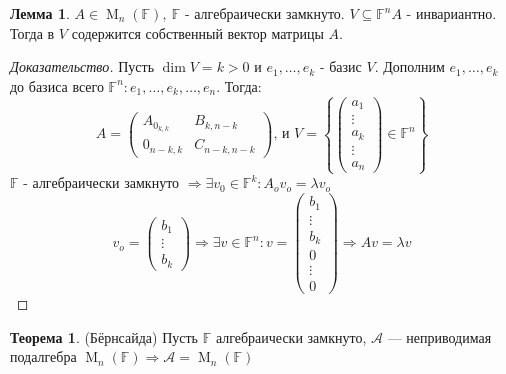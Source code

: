 \documentclass[a4paper, 14pt]{extarticle}
\theoremstyle{definition}
\newtheorem{theorem}{Теорема}
\newtheorem{lemma}{Лемма}
\begin{document}
\begin{lemma} \label{lm2_3}
	\(A \in \operatorname{M}_n(\mathbb{F}),\ \mathbb{F}\) - алгебраически замкнуто. \(V \subseteq \mathbb{F}^n A\) - инвариантно. Тогда в \(V\) содержится собственный вектор матрицы \(A\).
\end{lemma}

\begin{proof}[Доказательство]
	Пусть \(\operatorname{dim}V = k > 0\) и \(e_1, \dots, e_k\) - базис \(V\). Дополним \(e_1, \dots, e_k\) до базиса всего \(\mathbb{F}^n : e_1, \dots, e_k, \dots, e_n\). Тогда:
	\[A = 
		\left(
			\begin{array}{c|c}
			A_{0_{k, k}} & B_{k, n - k}\\
			\hline
			0_{n - k, k} & C_{n - k, n - k}
			\end{array}
		\right) \text{, и } V = \left\{
			\left(
			\begin{array}{c}
				a_1\\
				\vdots\\
				a_k\\
				\vdots\\
				a_n
			\end{array}
			\right) \in \mathbb{F}^n
		\right\}
	\]
	\(\mathbb{F}\) - алгебраически замкнуто \(\Rightarrow \exists v_0 \in \mathbb{F}^k : A_ov_o = \lambda v_o\)
	\[v_o = \left(
		\begin{array}{c}
			b_1\\
			\vdots\\
			b_k
		\end{array}
	\right) \Rightarrow \exists v \in \mathbb{F}^n : v = \left(
		\begin{array}{c}
			b_1\\
			\vdots\\
			b_k\\
			0\\
			\vdots\\
			0
		\end{array}
	\right) \Rightarrow Av = \lambda v\]
\end{proof}

\begin{theorem} \label{th2_1}
	(Бёрнсайда) Пусть \(\mathbb{F}\) алгебраически замкнуто, \(\mathcal{A}\) --- неприводимая подалгебра \(\operatorname{M}_n(\mathbb{F}) \Rightarrow \mathcal{A} = \operatorname{M}_n(\mathbb{F})\)
\end{theorem}
\end{document}
